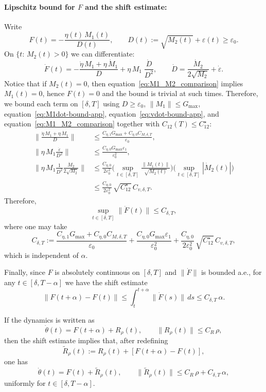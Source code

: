 \documentclass{article} %
\def\eqref#1{equation~\ref{#1}}
\begin{document}
\paragraph{Lipschitz bound for $F$ and the shift estimate:}
Write
\[
F(t)=-\frac{\eta(t)\,M_1(t)}{D(t)},
\qquad D(t):=\sqrt{M_2(t)}+\varepsilon(t)\ge \varepsilon_0.
\]
On $\{t:\,M_2(t)>0\}$ we can differentiate:
\[
\dot F(t)
= -\frac{\dot\eta\,M_1+\eta\,\dot M_1}{D}
+\eta\,M_1\;\frac{\dot D}{D^2},
\qquad
\dot D=\frac{\dot M_2}{2\sqrt{M_2}}+\dot\varepsilon.
\]
Notice that if $M_2(t)=0$, then \eqref{eq:M1_M2_comparison} implies $M_1(t)=0$, hence $F(t)=0$ and the bound is trivial at such times. Therefore, we bound each term on $[\delta,T]$ using $D\ge\varepsilon_0$, $\|M_1\|\le G_{\max}$, \eqref{eq:M1dot-bound-app}, \eqref{eq:vdot-bound-app},
and \eqref{eq:M1_M2_comparison} together with $C_{12}(T)\le C_{12}^\star$:
\begin{align*}
\Big\|\frac{\dot\eta\,M_1+\eta\,\dot M_1}{D}\Big\|
&\le \frac{C_{\eta,1}G_{\max}+C_{\eta,0}C_{M,\delta,T}}{\varepsilon_0},\\
\Big\|\eta\,M_1\frac{\dot\varepsilon}{D^2}\Big\|
&\le \frac{C_{\eta,0}G_{\max}\varepsilon_1}{\varepsilon_0^2},\\
\Big\|\eta\,M_1\frac{1}{D^2}\frac{\dot M_2}{2\sqrt{M_2}}\Big\|
&\le \frac{C_{\eta,0}}{2\varepsilon_0^2}
\Big(\sup_{t\in[\delta,T]}\frac{\|M_1(t)\|}{\sqrt{M_2(t)}}\Big)
\Big(\sup_{t\in[\delta,T]}|\dot M_2(t)|\Big)\\
&\le \frac{C_{\eta,0}}{2\varepsilon_0^2}\,\sqrt{C_{12}^\star}\,C_{v,\delta,T}.
\end{align*}
Therefore,
\[
\sup_{t\in[\delta,T]}\|\dot F(t)\|\le C_{\delta,T},
\]
where one may take
\[
C_{\delta,T}:=
\frac{C_{\eta,1}G_{\max}+C_{\eta,0}C_{M,\delta,T}}{\varepsilon_0}
+\frac{C_{\eta,0}G_{\max}\varepsilon_1}{\varepsilon_0^2}
+\frac{C_{\eta,0}}{2\varepsilon_0^2}\,\sqrt{C_{12}^\star}\,C_{v,\delta,T},
\]
which is independent of $\alpha$.

Finally, since $F$ is absolutely continuous on $[\delta,T]$ and $\|\dot F\|$ is bounded a.e., for any $t\in[\delta,T-\alpha]$ we have the shift estimate
\[
\|F(t+\alpha)-F(t)\|
\le \int_t^{t+\alpha}\|\dot F(s)\|\,ds
\le C_{\delta,T}\,\alpha.
\]

If the dynamics is written as
\[
\dot\theta(t)=F(t+\alpha)+R_\rho(t),\qquad \|R_\rho(t)\|\le C_R\,\rho,
\]
then the shift estimate implies that, after redefining
\[
\widetilde R_\rho(t):=R_\rho(t)+\left[F(t+\alpha)-F(t)\right],
\]
one has
\[
\dot\theta(t)=F(t)+\widetilde R_\rho(t),
\qquad 
\|\widetilde R_\rho(t)\|\le C_R\,\rho+C_{\delta,T}\,\alpha,
\]
uniformly for $t\in[\delta,T-\alpha]$.
\end{document}
